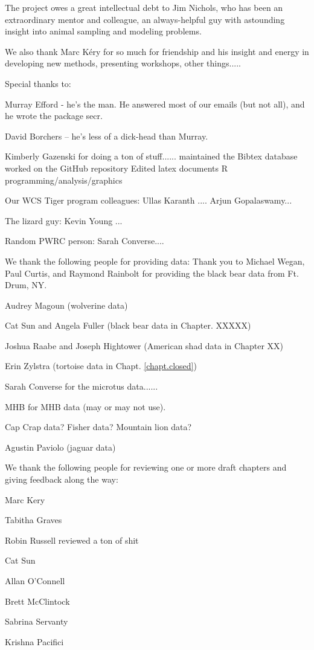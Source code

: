 The project owes a great intellectual debt to Jim Nichols, who has
been an extraordinary mentor and colleague, an always-helpful guy with
astounding insight into animal sampling and modeling problems. 

We also thank Marc K\'{e}ry for so much for friendship and his insight
and energy in developing new methods, presenting workshops, other things.....


Special thanks to:

Murray Efford - he's the man. He answered most of our emails (but not
all), and he wrote the package secr.

David Borchers -- he's less of a dick-head than Murray.

Kimberly Gazenski for doing a ton of stuff......
maintained the Bibtex database
worked on the GitHub repository
Edited latex documents
R programming/analysis/graphics

Our WCS Tiger program colleagues:
Ullas Karanth ....
Arjun Gopalaswamy...

The lizard guy:
Kevin Young ...

Random PWRC person:
Sarah Converse....



We thank the following people for providing data:
Thank you to Michael Wegan, Paul Curtis, and Raymond Rainbolt for providing the black bear data from Ft. Drum, NY. 

Audrey Magoun (wolverine data)

Cat Sun and Angela Fuller (black bear data in Chapter. XXXXX)



Joshua Raabe and Joseph Hightower (American shad data in Chapter XX)

Erin Zylstra (tortoise data in Chapt. \ref{chapt.closed})

Sarah Converse for the microtus data......

MHB for MHB data (may or may not use).

Cap Crap data? Fisher data?  Mountain lion data?

Agustin Paviolo (jaguar data)


We thank the following people for reviewing one or more draft chapters
and giving feedback along the way:

Marc Kery

Tabitha Graves

Robin Russell reviewed a ton of shit

Cat Sun

Allan O'Connell

Brett McClintock

Sabrina Servanty

Krishna Pacifici



